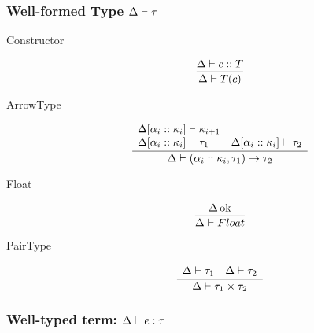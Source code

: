 \documentclass[12pt,twoside,fleqn]{amsart}
\theoremstyle{plain}
\theoremstyle{plain}
\theoremstyle{definition}
\begin{document}
\subsubsection{Well-formed Type \protect\( \Delta  \vdash \tau  \protect \)}

\begin{description}
\item [Constructor]
\[
\frac{\Delta  \vdash c  ::T }{\Delta  \vdash T(c) }\]

\item [ArrowType]
\[
\frac{\begin{array}{ll}
\Delta  [\alpha _{i}  ::\kappa _{i}  ] \vdash \kappa _{i+1} & \\
\Delta  [\alpha _{i}  ::\kappa _{i}  ] \vdash \tau _{1} & \Delta  [\alpha _{i}  ::\kappa _{i}  ] \vdash \tau _{2}
\end{array}}{\Delta  \vdash (\alpha _{i}::\kappa _{i},\tau _{1})\rightarrow \tau _{2} }\]

\item [Float]
\[
\frac{\Delta  \, \mathrm{ok} }{\Delta  \vdash Float  }\]

\item [PairType]
\[
\frac{\begin{array}{ll}
\Delta  \vdash \tau _{1}  & \Delta  \vdash \tau _{2} 
\end{array}}{\Delta  \vdash \tau _{1}\times \tau _{2} }\]

\end{description}

\subsubsection{Well-typed term: \protect\( \Delta  \vdash e  :\tau  \protect \)}
\end{document}
